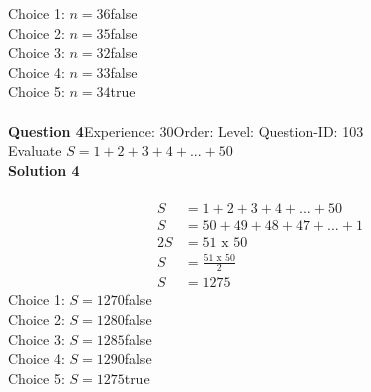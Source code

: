 \documentclass{article}
\begin{document}
Choice 1: \hspace{20pt}$n=36$\hspace{20pt}false\\
Choice 2: \hspace{20pt}$n=35$\hspace{20pt}false\\
Choice 3: \hspace{20pt}$n=32$\hspace{20pt}false\\
Choice 4: \hspace{20pt}$n=33$\hspace{20pt}false\\
Choice 5: \hspace{20pt}$n=34$\hspace{20pt}true\\
\\[4pt]
\noindent\textbf{Question 4}\hspace{20pt}Experience: 30\hspace{20pt}Order: \hspace{20pt}Level: \hspace{20pt}Question-ID: 103\\[2pt]
Evaluate $S=1+2+3+4+...+50$\\[4pt]
\noindent\textbf{Solution 4}\\[2pt]
\\[-35pt]\begin{align*}
S&=1+2+3+4+...+50\\[2pt]
S&=50+49+48+47+...+1\\[2pt]
2S&=51\,\,\text{x}\,\,50\\[2pt]
S&=\displaystyle\frac{51\,\,\text{x}\,\,50}{2}\\[2pt]
S&=1275
\end{align*}
Choice 1: \hspace{20pt}$S=1270$\hspace{20pt}false\\
Choice 2: \hspace{20pt}$S=1280$\hspace{20pt}false\\
Choice 3: \hspace{20pt}$S=1285$\hspace{20pt}false\\
Choice 4: \hspace{20pt}$S=1290$\hspace{20pt}false\\
Choice 5: \hspace{20pt}$S=1275$\hspace{20pt}true\\
\end{document}

